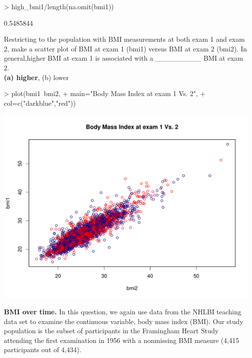 \documentclass{article}
\begin{document}
\begin{enumerate}
\begin{Schunk}
\begin{Sinput}
> high_bmi1/length(na.omit(bmi1))
\end{Sinput}
\begin{Soutput}
[1] 0.5485844
\end{Soutput}
\end{Schunk}

Restricting to the population with BMI measurements at both exam 1 and exam 2, make a scatter plot of BMI at exam 1 (bmi1) versus BMI at exam 2 (bmi2). In general,higher BMI at exam 1 is associated with a  \_\_\_\_\_\_\_\_\_  BMI at exam 2.\\
\textbf{(a) higher}, (b) lower

\begin{Schunk}
\begin{Sinput}
> plot(bmi1~bmi2, 
+      main="Body Mass Index at exam 1 Vs. 2",
+      col=c("darkblue","red"))
\end{Sinput}
\end{Schunk}
\includegraphics{Week1-scatter}

\end{enumerate}
\pagebreak
\textbf{BMI over time.} In this question, we again use data from the NHLBI teaching data set to examine the continuous variable, body mass index (BMI).   Our study population is the subset of participants in the Framingham Heart Study attending the first examination in 1956 with a nonmissing BMI measure (4,415 participants out of 4,434). 
\end{document}
